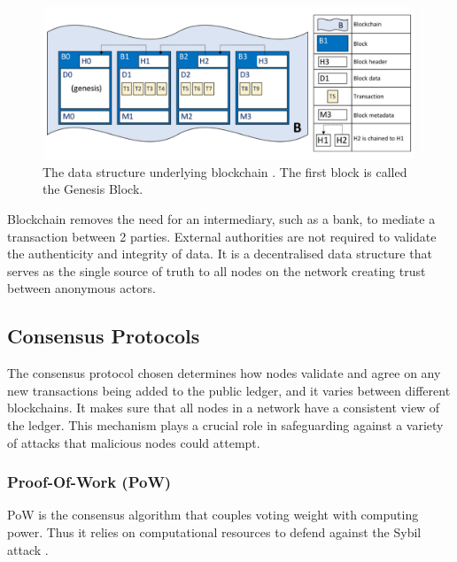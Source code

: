 \begin{figure}[h]
    \centering
    \includegraphics[width=13cm,center]{Figures/BlockchainStructure.png}
    \caption{The data structure underlying blockchain \cite{ADocumentation}. The first block is called the Genesis Block.}
    \label{Figure:BasicBlockchain}
\end{figure}

Blockchain removes the need for an intermediary, such as a bank, to mediate a transaction between 2 parties. External authorities are not required to validate the authenticity and integrity of data. It is a decentralised data structure that serves as the single source of truth to all nodes on the network creating trust between anonymous actors.




\subsection{Consensus Protocols}

The consensus protocol chosen determines how nodes validate and agree on any new transactions being added to the public ledger, and it varies between different blockchains. It makes sure that all nodes in a network have a consistent view of the ledger. This mechanism plays a crucial role in safeguarding against a variety of attacks that malicious nodes could attempt.

\subsubsection{Proof-Of-Work (PoW)}

PoW is the consensus algorithm that couples voting weight with computing 
power. Thus it relies on computational resources to defend against the Sybil attack \cite{Sedlmeir2020TheMyth}.

